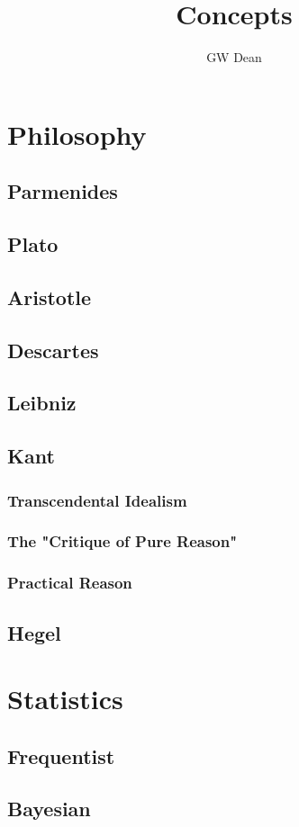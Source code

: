 \documentclass[a4paper,11pt]{article}
\author{GW Dean}
\title{Concepts}
\begin{document}
\maketitle
\tableofcontents
\section{Philosophy}
\subsection{Parmenides}
\subsection{Plato}
\subsection{Aristotle}
\subsection{Descartes}
\subsection{Leibniz}
\subsection{Kant}
\subsubsection{Transcendental Idealism}
\subsubsection{The "Critique of Pure Reason"}
\subsubsection{Practical Reason}
\subsection{Hegel}
\section{Statistics}
\subsection{Frequentist}
\subsection{Bayesian}
\end{document}
